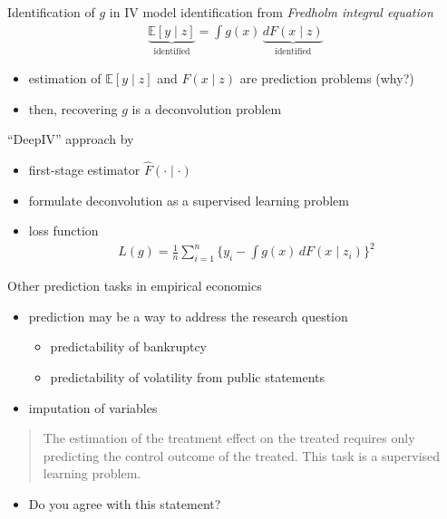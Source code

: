 \documentclass[xcolor=dvipsnames]{beamer}
\newcommand{\E}{\mathbb{E}}
\begin{document}
\begin{frame}{Identification of $g$ in IV model}
identification from \emph{Fredholm integral equation}
\begin{align*}
  \underbrace{\E[y \mid z]}_{\text{identified}} = \int g(x) \, \underbrace{dF(x \mid z)}_{\text{identified}}
\end{align*}
\begin{itemize}
  \item estimation of $\E[y \mid z]$ and $F(x \mid z)$ are prediction problems (why?)
  \item then, recovering $g$ is a deconvolution problem
\end{itemize}
\end{frame}


\begin{frame}{``DeepIV'' approach by \textcite{hartford2017deep}}
\begin{itemize}
  \item first-stage estimator $\hat{F}(\cdot \mid \cdot)$
  \item formulate deconvolution as a supervised learning problem
  \item loss function
  \begin{align*}
    L(g) = \frac{1}{n} \sum_{i=1}^n \Big\{
      y_i - \int g(x) \, dF(x \mid z_i)
    \Big\}^2 
  \end{align*}
\end{itemize}
\end{frame}


\begin{frame}{Other prediction tasks in empirical economics}
\begin{itemize}
  \item 
  prediction may be a way to address the research question
  \begin{itemize}
    \item predictability of bankruptcy \parencite{becerra2005neural}
    \item predictability of volatility from public statements \parencite{kogan2009predicting}
  \end{itemize}
  \item 
  imputation of variables
\end{itemize}
\pause
\begin{quote}
The estimation of the treatment effect on the treated requires only predicting the control outcome of the treated. 
This task is a supervised learning problem.
\end{quote}
\begin{itemize}
  \item Do you agree with this statement?
\end{itemize}
\end{frame}
\end{document}

